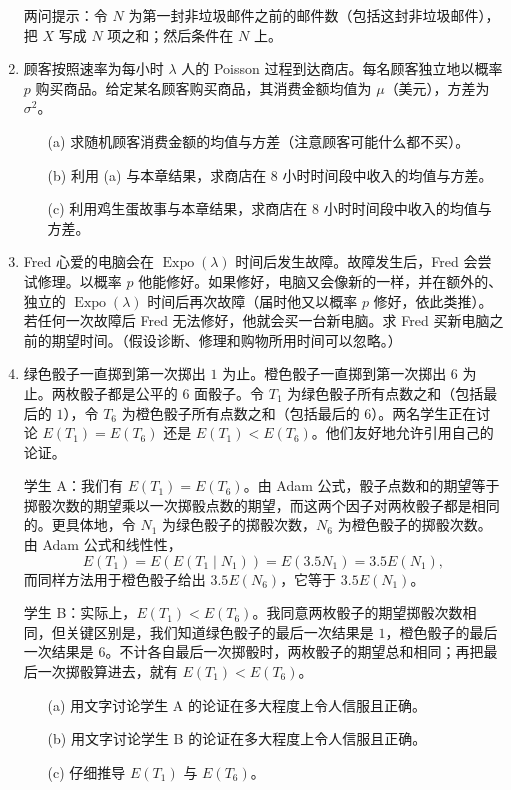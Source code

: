 \documentclass[UTF8, 12pt, fontset=fandol, oneside]{ctexart}
\begin{document}
\begin{enumerate}
  \noindent 两问提示：令 $N$ 为第一封非垃圾邮件之前的邮件数（包括这封非垃圾邮件），把 $X$ 写成 $N$ 项之和；然后条件在 $N$ 上。

  \item 顾客按照速率为每小时 $\lambda$ 人的 Poisson 过程到达商店。每名顾客独立地以概率 $p$ 购买商品。给定某名顾客购买商品，其消费金额均值为 $\mu$（美元），方差为 $\sigma^2$。
  \begin{enumerate}
    \item[(a)] 求随机顾客消费金额的均值与方差（注意顾客可能什么都不买）。
    \item[(b)] 利用 (a) 与本章结果，求商店在 8 小时时间段中收入的均值与方差。
    \item[(c)] 利用鸡生蛋故事与本章结果，求商店在 8 小时时间段中收入的均值与方差。
  \end{enumerate}

  \item Fred 心爱的电脑会在 $\operatorname{Expo}(\lambda)$ 时间后发生故障。故障发生后，Fred 会尝试修理。以概率 $p$ 他能修好。如果修好，电脑又会像新的一样，并在额外的、独立的 $\operatorname{Expo}(\lambda)$ 时间后再次故障（届时他又以概率 $p$ 修好，依此类推）。若任何一次故障后 Fred 无法修好，他就会买一台新电脑。求 Fred 买新电脑之前的期望时间。（假设诊断、修理和购物所用时间可以忽略。）

  \item 绿色骰子一直掷到第一次掷出 $1$ 为止。橙色骰子一直掷到第一次掷出 $6$ 为止。两枚骰子都是公平的 6 面骰子。令 $T_1$ 为绿色骰子所有点数之和（包括最后的 $1$），令 $T_6$ 为橙色骰子所有点数之和（包括最后的 $6$）。两名学生正在讨论 $E(T_1)=E(T_6)$ 还是 $E(T_1)<E(T_6)$。他们友好地允许引用自己的论证。

  学生 A：我们有 $E(T_1)=E(T_6)$。由 Adam 公式，骰子点数和的期望等于掷骰次数的期望乘以一次掷骰点数的期望，而这两个因子对两枚骰子都是相同的。更具体地，令 $N_1$ 为绿色骰子的掷骰次数，$N_6$ 为橙色骰子的掷骰次数。由 Adam 公式和线性性，
  \[
    E(T_1)=E(E(T_1\mid N_1))=E(3.5N_1)=3.5E(N_1),
  \]
  而同样方法用于橙色骰子给出 $3.5E(N_6)$，它等于 $3.5E(N_1)$。

  学生 B：实际上，$E(T_1)<E(T_6)$。我同意两枚骰子的期望掷骰次数相同，但关键区别是，我们知道绿色骰子的最后一次结果是 $1$，橙色骰子的最后一次结果是 $6$。不计各自最后一次掷骰时，两枚骰子的期望总和相同；再把最后一次掷骰算进去，就有 $E(T_1)<E(T_6)$。
  \begin{enumerate}
    \item[(a)] 用文字讨论学生 A 的论证在多大程度上令人信服且正确。
    \item[(b)] 用文字讨论学生 B 的论证在多大程度上令人信服且正确。
    \item[(c)] 仔细推导 $E(T_1)$ 与 $E(T_6)$。
  \end{enumerate}


\end{enumerate}
\end{document}
